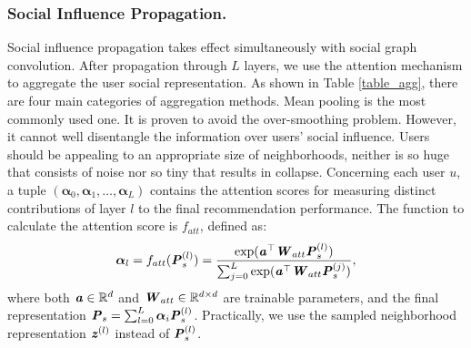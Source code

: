 \documentclass[letterpaper]{article} %
\begin{document}
\subsubsection{Social Influence Propagation.}
Social influence propagation takes effect simultaneously with social graph convolution. After propagation through $L$ layers, we use the attention mechanism \cite{attention} to aggregate the user social representation. As shown in Table \ref{table_agg}, there are four main categories of aggregation methods. Mean pooling is the most commonly used one. It is proven to avoid the over-smoothing problem. However, it cannot well disentangle the information over users' social influence. Users should be appealing to an appropriate size of neighborhoods, neither is so huge that consists of noise nor so tiny that results in collapse. Concerning each user $u$, a tuple $(\boldsymbol{\alpha}_{0},\boldsymbol{\alpha}_{1},\ldots,\boldsymbol{\alpha}_{L})$ contains the attention scores for measuring distinct contributions of layer $l$ to the final recommendation performance. The function to calculate the attention score is $f_{att}$, defined as:
\begin{align}
    \boldsymbol{\alpha}_l = f_{att}(\textbf{\textit{P}}_{s}^{(l)}) = \frac{\exp(\textbf{\textit{a}}^{\top}\textbf{\textit{W}}_{att} \textbf{\textit{P}}^{(l)}_{s})}{\sum_{j=0}^{L}\exp(\textbf{\textit{a}}^{\top}\textbf{\textit{W}}_{att}\textbf{\textit{P}}^{(j)}_s)},
\end{align}
where both $\textbf{\textit{a}}\in \mathbb{R}^{d}$ and $\textbf{\textit{W}}_{att}\in \mathbb{R}^{d\times d}$ are trainable parameters, and the final representation $\textbf{\textit{P}}_s=\sum_{l=0}^{L}{\boldsymbol{\alpha}_i\textbf{\textit{P}}^{(l)}_s}$. Practically, we use the sampled neighborhood representation $\textbf{\textit{z}}^{(l)}$ instead of $\textbf{\textit{P}}_s^{(l)}$.
\end{document}
